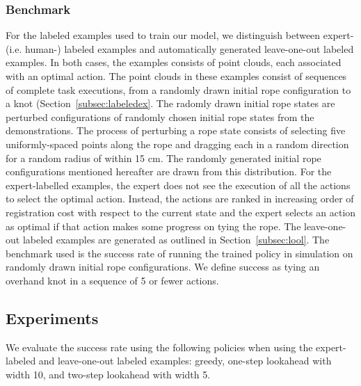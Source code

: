 \subsubsection{Benchmark}
For the labeled examples  used to train our \mmql{} model, we distinguish between expert- (i.e. human-) labeled examples and automatically generated leave-one-out labeled examples.
In both cases, the examples consists of point clouds, each associated with an optimal action.
The point clouds in these examples consist of sequences of complete task executions, from a randomly drawn initial rope configuration to a knot (Section~\ref{subsec:labeledex}.
The radomly drawn initial rope states are perturbed configurations of randomly chosen initial rope states from the demonstrations.
The process of perturbing a rope state consists of selecting five uniformly-spaced points along the rope and dragging each in a random direction for a random radius of within 15 cm.
The randomly generated initial rope configurations mentioned hereafter are drawn from this distribution.
For the expert-labelled examples, the expert does not see the execution of all the actions to select the optimal action.
Instead, the actions are ranked in increasing order of registration cost with respect to the current state and the expert selects an action as optimal if that action makes some progress on tying the rope.
The leave-one-out labeled examples are generated as outlined in Section~\ref{subsec:lool}. 
The benchmark used is the success rate of running the trained policy in simulation on randomly drawn initial rope configurations. 
We define success as tying an overhand knot in a sequence of 5 or fewer actions.

\subsection{Experiments}
We evaluate the success rate using the following policies when using the expert-labeled and leave-one-out labeled examples: greedy, one-step lookahead with width 10, and two-step lookahead with width 5.
